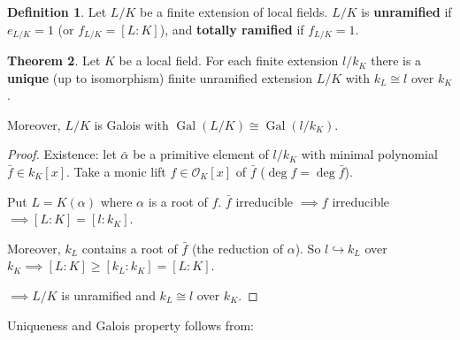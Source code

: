 \documentclass[a4paper]{article}
\theoremstyle{definition}
\newtheorem{definition}{Definition}
\theoremstyle{default}
\newtheorem{theorem}[definition]{Theorem}
\theoremstyle{remark}
\DeclareMathOperator{\Gal}{Gal}
\begin{document}
\begin{definition}
	Let $L/K$ be a finite extension of local fields.
	$L/K$ is \textbf{unramified} if $e_{L/K} = 1$ (or $f_{L/K} = [L:K]$),
	and \textbf{totally ramified} if $f_{L/K} =1$.
\end{definition}

\begin{theorem}
	Let $K$ be a local field.
	For each finite extension $l/k_K$ there is a \textbf{unique} (up to isomorphism) finite unramified extension $L/K$ with $k_L \cong l$ over $k_K$.
	
	Moreover, $L/K$ is Galois with $\Gal(L/K) \cong \Gal(l/k_K)$.
	\label{73}
\end{theorem}
\begin{proof}
	Existence: let $\bar{\alpha}$ be a primitive element of $l/k_K$ with minimal polynomial $\bar{f} \in k_K[x]$.
	Take a monic lift $f \in \mathcal{O}_K[x]$ of $\bar{f}$ ($\deg f = \deg \bar{f}$).
	
	Put $L=K(\alpha)$ where $\alpha$ is a root of $f$.
	$\bar{f}$ irreducible $\implies f$ irreducible $\implies [L:K] = [l:k_K]$.
	
	Moreover, $k_L$ contains a root of $\bar{f}$ (the reduction of $\alpha$).
	So $l \hookrightarrow k_L$ over $k_K \implies [L:K] \geq [k_L:k_K] = [L:K]$.
	
	$\implies L/K$ is unramified and $k_L \cong l$ over $k_K$.
\end{proof}

Uniqueness and Galois property follows from:
\end{document}
